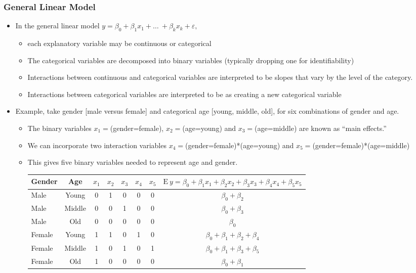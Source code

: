 \begin{frame}[shrink=10]
\frametitle{General Linear Model}
\begin{itemize}
\item In the general linear model
$ y=\beta _{0}+\beta _{1}x_{1}+\ldots \ +\beta _{k}x_{k} +
\varepsilon,$
\begin{itemize}
\item each explanatory variable may be continuous or
categorical
\item The categorical variables are decomposed into binary variables
(typically dropping one for identifiability)
\item Interactions between continuous and categorical variables are
interpreted to be slopes that vary by the level of the category.
\item Interactions between categorical variables are interpreted to
be as creating a new categorical variable
\end{itemize}
\item Example, take gender [male versus female] and
categorical age [young, middle, old], for six combinations of gender
and age.
\begin{itemize}
\item The binary variables $x_1=$(gender=female), $x_2=$(age=young) and
$x_3=$(age=middle) are known as ``main effects.''
\item We can incorporate two interaction variables
$x_4=$(gender=female)*(age=young) and
$x_5=$(gender=female)*(age=middle)
\item This gives five binary variables needed to represent age and gender.

  \begin{center}
\begin{tabular}{lc|ccccc|c}
\hline Gender & Age & $x_1$ & $x_2$ &  $x_3$ &  $x_4$ &  $x_5$ & $
\mathrm{E~}y=\beta_0 + \beta_1 x_1+ \beta_2 x_2+ \beta_3 x_3+
\beta_4 x_4+ \beta_5 x_5$
\\
\hline
Male & Young    & 0 & 1 & 0 & 0 & 0 & $\beta_0 +\beta_2$\\
Male & Middle   & 0 & 0 & 1 & 0 & 0 & $\beta_0 +\beta_3$\\
Male & Old      & 0 & 0 & 0 & 0 & 0 & $\beta_0 $\\
Female & Young  & 1 & 1 & 0 & 1 & 0 & $\beta_0 +\beta_1+\beta_2+\beta_4$\\
Female & Middle & 1 & 0 & 1 & 0 & 1 & $\beta_0 +\beta_1+\beta_3+\beta_5$\\
Female & Old    & 1 & 0 & 0 & 0 & 0 & $\beta_0 +\beta_1$\\
 \hline
\end{tabular}
 \end{center}  




\end{itemize}
\end{itemize}
\end{frame}
